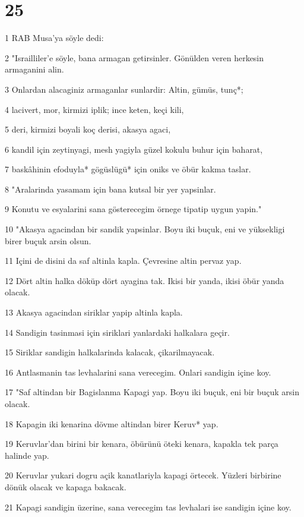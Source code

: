 \chapter{25}

\par 1 RAB Musa'ya söyle dedi:
\par 2 "Israilliler'e söyle, bana armagan getirsinler. Gönülden veren herkesin armaganini alin.
\par 3 Onlardan alacaginiz armaganlar sunlardir: Altin, gümüs, tunç*;
\par 4 lacivert, mor, kirmizi iplik; ince keten, keçi kili,
\par 5 deri, kirmizi boyali koç derisi, akasya agaci,
\par 6 kandil için zeytinyagi, mesh yagiyla güzel kokulu buhur için baharat,
\par 7 baskâhinin efoduyla* gögüslügü* için oniks ve öbür kakma taslar.
\par 8 "Aralarinda yasamam için bana kutsal bir yer yapsinlar.
\par 9 Konutu ve esyalarini sana gösterecegim örnege tipatip uygun yapin."
\par 10 "Akasya agacindan bir sandik yapsinlar. Boyu iki buçuk, eni ve yüksekligi birer buçuk arsin olsun.
\par 11 Içini de disini da saf altinla kapla. Çevresine altin pervaz yap.
\par 12 Dört altin halka döküp dört ayagina tak. Ikisi bir yanda, ikisi öbür yanda olacak.
\par 13 Akasya agacindan siriklar yapip altinla kapla.
\par 14 Sandigin tasinmasi için siriklari yanlardaki halkalara geçir.
\par 15 Siriklar sandigin halkalarinda kalacak, çikarilmayacak.
\par 16 Antlasmanin tas levhalarini sana verecegim. Onlari sandigin içine koy.
\par 17 "Saf altindan bir Bagislanma Kapagi yap. Boyu iki buçuk, eni bir buçuk arsin olacak.
\par 18 Kapagin iki kenarina dövme altindan birer Keruv* yap.
\par 19 Keruvlar'dan birini bir kenara, öbürünü öteki kenara, kapakla tek parça halinde yap.
\par 20 Keruvlar yukari dogru açik kanatlariyla kapagi örtecek. Yüzleri birbirine dönük olacak ve kapaga bakacak.
\par 21 Kapagi sandigin üzerine, sana verecegim tas levhalari ise sandigin içine koy.
